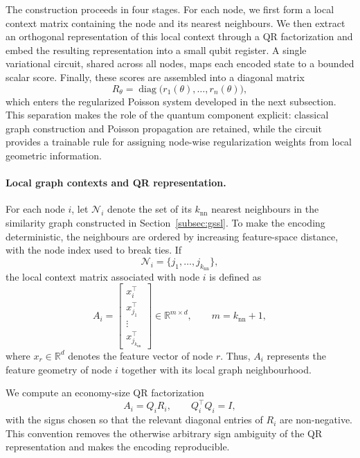 \documentclass[11pt,a4paper]{article}
\begin{document}
The construction proceeds in four stages. For each node, we first form a local
context matrix containing the node and its nearest neighbours. We then extract
an orthogonal representation of this local context through a QR factorization
and embed the resulting representation into a small qubit register. A single
variational circuit, shared across all nodes, maps each encoded state to a
bounded scalar score. Finally, these scores are assembled into a diagonal
matrix
\[
R_\theta
=
\operatorname{diag}
\bigl(
r_1(\theta),\ldots,r_n(\theta)
\bigr),
\]
which enters the regularized Poisson system developed in the next subsection.
This separation makes the role of the quantum component explicit: classical
graph construction and Poisson propagation are retained, while the circuit
provides a trainable rule for assigning node-wise regularization weights from
local geometric information.

\paragraph{Local graph contexts and QR representation.}

For each node \(i\), let \(\mathcal{N}_i\) denote the set of its
\(k_{\mathrm{nn}}\) nearest neighbours in the similarity graph constructed in
Section~\ref{subsec:gssl}. To make the encoding deterministic, the neighbours
are ordered by increasing feature-space distance, with the node index used to
break ties. If
\[
\mathcal{N}_i
=
\{j_1,\ldots,j_{k_{\mathrm{nn}}}\},
\]
the local context matrix associated with node \(i\) is defined as
\begin{equation}
A_i
=
\begin{bmatrix}
x_i^\top\\[2pt]
x_{j_1}^\top\\
\vdots\\
x_{j_{k_{\mathrm{nn}}}}^\top
\end{bmatrix}
\in
\mathbb{R}^{m\times d},
\qquad
m=k_{\mathrm{nn}}+1,
\label{eq:local_context_matrix}
\end{equation}
where \(x_r\in\mathbb{R}^d\) denotes the feature vector of node \(r\).
Thus, \(A_i\) represents the feature geometry of node \(i\) together with its
local graph neighbourhood.

We compute an economy-size QR factorization
\begin{equation}
A_i=Q_iR_i,
\qquad
Q_i^\top Q_i=I,
\label{eq:local_qr}
\end{equation}
with the signs chosen so that the relevant diagonal entries of \(R_i\) are
non-negative. This convention removes the otherwise arbitrary sign ambiguity
of the QR representation and makes the encoding reproducible.
\end{document}
